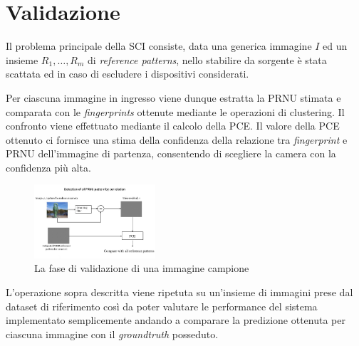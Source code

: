 \section{Validazione}

Il problema principale della SCI consiste, data una generica immagine $I$ ed un insieme $R_1, \ldots, R_m$ di \emph{reference patterns}, nello stabilire da sorgente è stata scattata ed in caso di escludere i dispositivi considerati.

Per ciascuna immagine in ingresso viene dunque estratta la PRNU stimata e comparata con le \emph{fingerprints} ottenute mediante le operazioni di clustering. Il confronto viene effettuato mediante il calcolo della PCE. Il valore della PCE ottenuto ci fornisce una stima della confidenza della relazione tra \emph{fingerprint} e PRNU dell'immagine di partenza, consentendo di scegliere la camera con la confidenza più alta.

\begin{figure}[h]
\begin{center}
\includegraphics[width=0.4\textwidth]{images/validation.jpg}
\end{center}
  \caption{La fase di validazione di una immagine campione}
\label{fig:validation}
\end{figure}

L'operazione sopra descritta viene ripetuta su un'insieme di immagini prese dal dataset di riferimento così da poter valutare le performance del sistema implementato semplicemente andando a comparare la predizione ottenuta per ciascuna immagine con il \emph{groundtruth} posseduto.